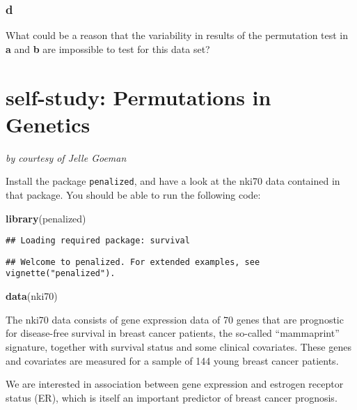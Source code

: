 \documentclass[]{article}
\newenvironment{Shaded}{\begin{snugshade}}{\end{snugshade}}
\newcommand{\KeywordTok}[1]{\textcolor[rgb]{0.13,0.29,0.53}{\textbf{#1}}}
\newcommand{\NormalTok}[1]{#1}
\begin{document}
\hypertarget{d-1}{%
\subsubsection{d}\label{d-1}}

What could be a reason that the variability in results of the
permutation test in \textbf{a} and \textbf{b} are impossible to test for
this data set?

\newpage

\hypertarget{self-study-permutations-in-genetics}{%
\section{self-study: Permutations in
Genetics}\label{self-study-permutations-in-genetics}}

\emph{by courtesy of Jelle Goeman}

Install the package \texttt{penalized}, and have a look at the nki70
data contained in that package. You should be able to run the following
code:

\begin{Shaded}
\begin{Highlighting}[]
\KeywordTok{library}\NormalTok{(penalized)}
\end{Highlighting}
\end{Shaded}

\begin{verbatim}
## Loading required package: survival
\end{verbatim}

\begin{verbatim}
## Welcome to penalized. For extended examples, see vignette("penalized").
\end{verbatim}

\begin{Shaded}
\begin{Highlighting}[]
\KeywordTok{data}\NormalTok{(nki70)}
\end{Highlighting}
\end{Shaded}

The nki70 data consists of gene expression data of 70 genes that are
prognostic for disease-free survival in breast cancer patients, the
so-called ``mammaprint'' signature, together with survival status and
some clinical covariates. These genes and covariates are measured for a
sample of 144 young breast cancer patients.

We are interested in association between gene expression and estrogen
receptor status (ER), which is itself an important predictor of breast
cancer prognosis.
\end{document}
